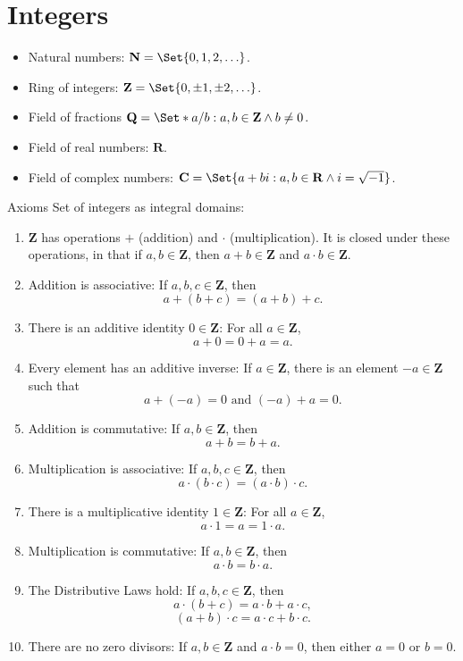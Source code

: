 \section{Integers}
\begin{itemize}
    \item Natural numbers: $ \mathbf{N}=\Set{0,1,2,\ldots} $.
    \item Ring of integers: $ \mathbf{Z}=\Set{0,\pm 1,\pm 2,\ldots} $.
    \item Field of fractions $ \mathbf{Q}=\Set*{a/b\given a,b\in\mathbf{Z}\land b\ne 0} $.
    \item Field of real numbers: $ \mathbf{R} $.
    \item Field of complex numbers: $ \mathbf{C}=\Set{a+bi\given a,b\in\mathbf{R}\land i=\sqrt{-1}} $.
\end{itemize}
\begin{Definition}{Axioms}{}
    Set of integers as integral domains:
    \begin{enumerate}[label=V\arabic*]
        \item $ \mathbf{Z} $ has operations $ + $ (addition) and $ \cdot $ (multiplication). It is closed
              under these operations, in that if $ a,b\in\mathbf{Z} $, then $ a+b\in\mathbf{Z} $ and $ a\cdot b\in\mathbf{Z} $.
        \item Addition is associative: If $ a,b,c\in\mathbf{Z} $, then
              \[ a+(b+c)=(a+b)+c. \]
        \item There is an additive identity $ 0\in\mathbf{Z} $: For all $ a\in\mathbf{Z} $,
              \[ a+0=0+a=a. \]
        \item Every element has an additive inverse: If $ a\in\mathbf{Z} $, there is an element $ -a\in\mathbf{Z} $ such that
              \[ a+(-a)=0\text{ and }(-a)+a=0. \]
        \item Addition is commutative: If $ a,b\in\mathbf{Z} $, then
              \[ a+b=b+a. \]
        \item Multiplication is associative: If $ a,b,c\in\mathbf{Z} $, then
              \[ a\cdot(b\cdot c)=(a\cdot b)\cdot c. \]
        \item There is a multiplicative identity $ 1\in\mathbf{Z} $: For all $ a\in\mathbf{Z} $,
              \[ a\cdot 1=a=1\cdot a. \]
        \item Multiplication is commutative: If $ a,b\in\mathbf{Z} $, then
              \[ a\cdot b=b\cdot a. \]
        \item The Distributive Laws hold: If $ a,b,c\in\mathbf{Z} $, then
              \[ a\cdot (b+c)=a\cdot b+a\cdot c, \]
              \[ (a+b)\cdot c=a\cdot c+b\cdot c. \]
        \item There are no zero divisors: If $ a,b\in\mathbf{Z} $ and $ a\cdot b=0 $, then either
              $ a=0 $ or $ b=0 $.
    \end{enumerate}
\end{Definition}
